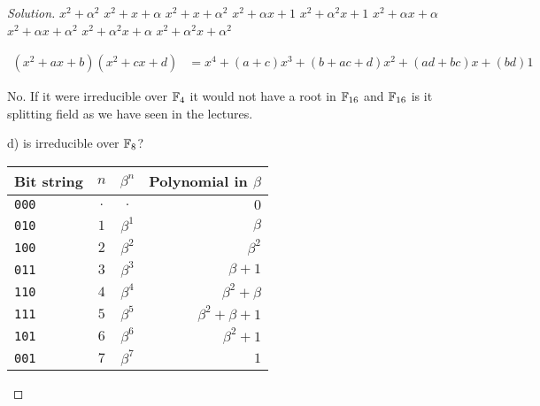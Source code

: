\begin{proof}[Solution]
$x^2 + \alpha^2$
$x^2 + x + \alpha$
$x^2 + x + \alpha^2$
$x^2 + \alpha x + 1$
$x^2 + \alpha^2 x + 1$
$x^2 + \alpha x + \alpha$
$x^2 + \alpha x + \alpha^2$
$x^2 + \alpha^2 x + \alpha$
$x^2 + \alpha^2 x + \alpha^2$

\begin{align*}
(x^2 + a x + b)(x^2 + c x + d ) &= x^4 + (a + c) x^3 + (b + ac + d) x^2 + (ad + bc) x + (bd) 1
\end{align*}

{\color{blue} No. If it were irreducible over $\mathbb{F}_4$ it would not have a root in $\mathbb{F}_{16}$ and $\mathbb{F}_{16}$ is it splitting field as we have seen in the lectures.}


d) is irreducible over $\mathbb{F}_8$?
\begin{tabular}{l|c|c|r}
Bit string & $n$ & $\beta^n$ & Polynomial in $\beta$\\
\hline
\texttt{000} & $ .$ & $.         $ & $0$\\
\texttt{010} & $ 1$ & $\beta^{ 1}$ & $\beta$\\ 
\texttt{100} & $ 2$ & $\beta^{ 2}$ & $\beta^2$\\
\texttt{011} & $ 3$ & $\beta^{ 3}$ & $\beta + 1$\\
\texttt{110} & $ 4$ & $\beta^{ 4}$ & $\beta^2 + \beta$\\
\texttt{111} & $ 5$ & $\beta^{ 5}$ & $\beta^2 + \beta + 1$\\
\texttt{101} & $ 6$ & $\beta^{ 6}$ & $\beta^2 + 1$\\
\texttt{001} & $ 7$ & $\beta^{ 7}$ & $1$
\end{tabular}


\end{proof}
